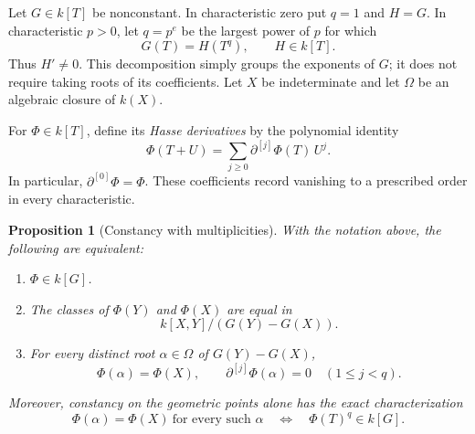 \documentclass[11pt]{article}
\theoremstyle{plain}
\newtheorem{proposition}[theorem]{Proposition}
\theoremstyle{definition}
\theoremstyle{remark}
\begin{document}
Let \(G\in k[T]\) be nonconstant. In characteristic zero put \(q=1\) and \(H=G\). In characteristic \(p>0\), let \(q=p^e\) be the largest power of \(p\) for which
\[
    G(T)=H(T^q),\qquad H\in k[T].
\]
Thus \(H'\ne0\). This decomposition simply groups the exponents of \(G\); it does not require taking roots of its coefficients. Let \(X\) be indeterminate and let \(\Omega\) be an algebraic closure of \(k(X)\).

For \(\Phi\in k[T]\), define its \emph{Hasse derivatives} by the polynomial identity
\[
    \Phi(T+U)=\sum_{j\ge0}\partial^{[j]}\Phi(T)\,U^j.
\]
In particular, \(\partial^{[0]}\Phi=\Phi\). These coefficients record vanishing to a prescribed order in every characteristic.

\begin{proposition}[Constancy with multiplicities]
\label{prop:fiber-multiplicity}
With the notation above, the following are equivalent:
\begin{enumerate}
    \item \(\Phi\in k[G]\).
    \item The classes of \(\Phi(Y)\) and \(\Phi(X)\) are equal in
    \[
        k[X,Y]/(G(Y)-G(X)).
    \]
    \item For every distinct root \(\alpha\in\Omega\) of \(G(Y)-G(X)\),
    \[
        \Phi(\alpha)=\Phi(X),\qquad
        \partial^{[j]}\Phi(\alpha)=0\quad(1\le j<q).
    \]
\end{enumerate}
Moreover, constancy on the geometric points alone has the exact characterization
\[
    \Phi(\alpha)=\Phi(X)\ \text{for every such }\alpha
    \quad\Longleftrightarrow\quad
    \Phi(T)^q\in k[G].
\]
\end{proposition}
\end{document}

